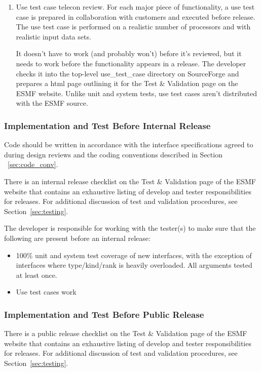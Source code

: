 \begin{enumerate}
\item Use test case telecon review. For each major piece of functionality, a use
test case is prepared in collaboration with customers and executed before
release. The use test case is performed on a realistic number of processors
and with realistic input data sets.

It doesn't have to work (and probably won't) before it's reviewed, but it
needs to work before the functionality appears in a release. The developer
checks it into the top-level use\_test\_case directory on SourceForge and
prepares a html page outlining it for the Test \& Validation page on the
ESMF website. Unlike unit and system tests, use test cases aren't
distributed with the ESMF source.
\end{enumerate}

\subsubsection{Implementation and Test Before Internal Release}

Code should be written in accordance with the interface specifications
agreed to during design reviews and the coding conventions described in 
Section ~\ref{sec:code_conv}.  

There is an internal release checklist on the Test \& Validation page of the
ESMF website that contains an exhaustive listing of develop and tester
responsibilities for releases.  For additional discussion
of test and validation procedures, see Section~\ref{sec:testing}.

The developer is responsible for working with the tester(s) to make sure
that the following are present before an internal release:
\begin{itemize}
\item 100\% unit and system test coverage of new interfaces, with the exception
of interfaces where type/kind/rank is heavily overloaded. All arguments tested
at least once.
\item Use test cases work
\end{itemize}

\subsubsection{Implementation and Test Before Public Release}

There is a public release checklist on the Test \& Validation page of the ESMF
website that contains an exhaustive listing of develop and tester
responsibilities for releases.  For additional discussion
of test and validation procedures, see Section~\ref{sec:testing}.

